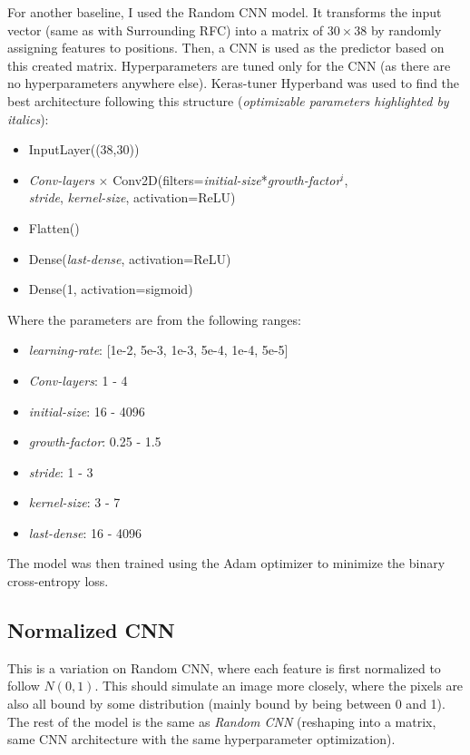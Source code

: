 For another baseline, I used the Random \ac{CNN} model. It transforms the input vector (same as with Surrounding RFC) into a matrix of $30 \times 38$ by randomly assigning features to positions. Then, a CNN is used as the predictor based on this created matrix. Hyperparameters are tuned only for the CNN (as there are no hyperparameters anywhere else). Keras-tuner Hyperband was used to find the best architecture following this structure (\textit{optimizable parameters highlighted by italics}):
\begin{itemize}
    \item InputLayer((38,30))
    \item \textit{Conv-layers} $\times$ Conv2D(filters=\textit{initial-size}*\textit{growth-factor}$^i$,\\
    \textit{stride}, \textit{kernel-size}, activation=ReLU)
    \item Flatten()
    \item Dense(\textit{last-dense}, activation=ReLU)
    \item Dense(1, activation=sigmoid)
\end{itemize}
Where the parameters are from the following ranges:
\begin{itemize}
    \item \textit{learning-rate}: [1e-2, 5e-3, 1e-3, 5e-4, 1e-4, 5e-5]
    \item \textit{Conv-layers}: 1 - 4
    \item \textit{initial-size}: 16 - 4096
    \item \textit{growth-factor}: 0.25 - 1.5
    \item \textit{stride}: 1 - 3
    \item \textit{kernel-size}: 3 - 7
    \item \textit{last-dense}: 16 - 4096
\end{itemize}

The model was then trained using the Adam optimizer to minimize the binary cross-entropy loss. 

\subsection{Normalized CNN}

This is a variation on Random \ac{CNN}, where each feature is first normalized to follow $N(0, 1)$. This should simulate an image more closely, where the pixels are also all bound by some distribution (mainly bound by being between 0 and 1). The rest of the model is the same as \textit{Random CNN} (reshaping into a matrix, same CNN architecture with the same hyperparameter optimization).

